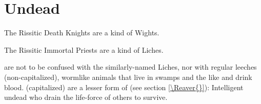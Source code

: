 \section{Undead}
The Rissitic Death Knights are a kind of Wights. 




The Rissitic Immortal Priests are a kind of Liches. 



\subsectionn{\Leech}
\Leeches{} are not to be confused with the similarly-named Liches, nor with regular leeches (non-capitalized), wormlike animals that live in swamps and the like and drink blood. \Leeches{} (capitalized) are a lesser form of \Reavers{} (see section \ref{\Reaver{}}): Intelligent undead who drain the life-force of others to survive. 

